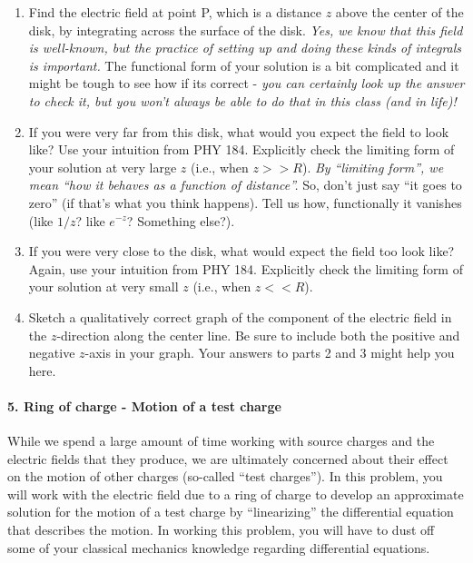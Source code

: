 \documentclass[11pt]{article}
\def\tightlist{}
\begin{document}
\begin{enumerate}
\def\labelenumi{\arabic{enumi}.}
\tightlist
\item
  Find the electric field at point P, which is a distance \(z\) above
  the center of the disk, by integrating across the surface of the disk.
  \emph{Yes, we know that this field is well-known, but the practice of
  setting up and doing these kinds of integrals is important.} The
  functional form of your solution is a bit complicated and it might be
  tough to see how if its correct - \emph{you can certainly look up the
  answer to check it, but you won't always be able to do that in this
  class (and in life)!}
\item
  If you were very far from this disk, what would you expect the field
  to look like? Use your intuition from PHY 184. Explicitly check the
  limiting form of your solution at very large \(z\) (i.e., when
  \(z >> R\)). \emph{By ``limiting form'', we mean ``how it behaves as a
  function of distance''.} So, don't just say ``it goes to zero'' (if
  that's what you think happens). Tell us how, functionally it vanishes
  (like \(1/z\)? like \(e^{-z}\)? Something else?).
\item
  If you were very close to the disk, what would expect the field too
  look like? Again, use your intuition from PHY 184. Explicitly check
  the limiting form of your solution at very small \(z\) (i.e., when
  \(z << R\)).
\item
  Sketch a qualitatively correct graph of the component of the electric
  field in the \(z\)-direction along the center line. Be sure to include
  both the positive and negative \(z\)-axis in your graph. Your answers
  to parts 2 and 3 might help you here.
\end{enumerate}

\paragraph{5. Ring of charge - Motion of a test
charge}\label{ring-of-charge---motion-of-a-test-charge}

While we spend a large amount of time working with source charges and
the electric fields that they produce, we are ultimately concerned about
their effect on the motion of other charges (so-called ``test
charges''). In this problem, you will work with the electric field due
to a ring of charge to develop an approximate solution for the motion of
a test charge by ``linearizing'' the differential equation that
describes the motion. In working this problem, you will have to dust off
some of your classical mechanics knowledge regarding differential
equations.
\end{document}
